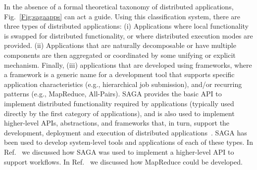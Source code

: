 \documentclass{rspublic}
\begin{document}


In the absence of a formal theoretical taxonomy of distributed
applications, Fig.~\ref{Fig:sagaapps} can act a guide. Using this
classification system, there are three types of distributed
applications: (i) Applications where local functionality is swapped
for distributed functionality, or where distributed execution modes
are provided. %
(ii) Applications that are naturally decomposable or have multiple
components are then aggregated or coordinated by some unifying or
explicit mechanism. %
Finally, (iii) applications that are developed using frameworks, where
a framework is a generic name for a development tool that supports
specific application characteristics (e.g., hierarchical job
submission), and/or recurring patterns (e.g., MapReduce, All-Pairs).
SAGA provides the basic API to implement distributed functionality
required by applications (typically used directly by the first
category of applications), and is also used to implement higher-level
APIs, abstractions, and frameworks that, in turn, support the
development, deployment and execution of distributed
applications~\cite{saga_gmac09}. SAGA has been used to develop
system-level tools and applications of each of these types. In
Ref.~\cite{saga_montage_escience09} we discussed how SAGA was used to
implement a higher-level API to support workflows. In
Ref.~\cite{saga_ccgrid09} we discussed how MapReduce could be
developed.
\end{document}
